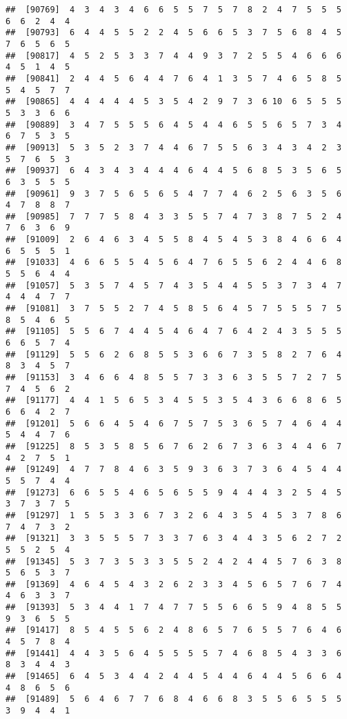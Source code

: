 \documentclass[
]{book}
\begin{document}
\begin{verbatim}
##  [90769]  4  3  4  3  4  6  6  5  5  7  5  7  8  2  4  7  5  5  5  6  6  2  4  4
##  [90793]  6  4  4  5  5  2  2  4  5  6  6  5  3  7  5  6  8  4  5  7  6  5  6  5
##  [90817]  4  5  2  5  3  3  7  4  4  9  3  7  2  5  5  4  6  6  6  4  5  1  4  5
##  [90841]  2  4  4  5  6  4  4  7  6  4  1  3  5  7  4  6  5  8  5  5  4  5  7  7
##  [90865]  4  4  4  4  4  5  3  5  4  2  9  7  3  6 10  6  5  5  5  5  3  3  6  6
##  [90889]  3  4  7  5  5  5  6  4  5  4  4  6  5  5  6  5  7  3  4  6  7  5  3  5
##  [90913]  5  3  5  2  3  7  4  4  6  7  5  5  6  3  4  3  4  2  3  5  7  6  5  3
##  [90937]  6  4  3  4  3  4  4  4  6  4  4  5  6  8  5  3  5  6  5  6  3  5  5  5
##  [90961]  9  3  7  5  6  5  6  5  4  7  7  4  6  2  5  6  3  5  6  4  7  8  8  7
##  [90985]  7  7  7  5  8  4  3  3  5  5  7  4  7  3  8  7  5  2  4  7  6  3  6  9
##  [91009]  2  6  4  6  3  4  5  5  8  4  5  4  5  3  8  4  6  6  4  6  5  5  5  1
##  [91033]  4  6  6  5  5  4  5  6  4  7  6  5  5  6  2  4  4  6  8  5  5  6  4  4
##  [91057]  5  3  5  7  4  5  7  4  3  5  4  4  5  5  3  7  3  4  7  4  4  4  7  7
##  [91081]  3  7  5  5  2  7  4  5  8  5  6  4  5  7  5  5  5  7  5  8  5  4  6  5
##  [91105]  5  5  6  7  4  4  5  4  6  4  7  6  4  2  4  3  5  5  5  6  6  5  7  4
##  [91129]  5  5  6  2  6  8  5  5  3  6  6  7  3  5  8  2  7  6  4  8  3  4  5  7
##  [91153]  3  4  6  6  4  8  5  5  7  3  3  6  3  5  5  7  2  7  5  7  4  5  6  2
##  [91177]  4  4  1  5  6  5  3  4  5  5  3  5  4  3  6  6  8  6  5  6  6  4  2  7
##  [91201]  5  6  6  4  5  4  6  7  5  7  5  3  6  5  7  4  6  4  4  5  4  4  7  6
##  [91225]  8  5  3  5  8  5  6  7  6  2  6  7  3  6  3  4  4  6  7  4  2  7  5  1
##  [91249]  4  7  7  8  4  6  3  5  9  3  6  3  7  3  6  4  5  4  4  5  5  7  4  4
##  [91273]  6  6  5  5  4  6  5  6  5  5  9  4  4  4  3  2  5  4  5  3  7  3  7  5
##  [91297]  1  5  5  3  3  6  7  3  2  6  4  3  5  4  5  3  7  8  6  7  4  7  3  2
##  [91321]  3  3  5  5  5  7  3  3  7  6  3  4  4  3  5  6  2  7  2  5  5  2  5  4
##  [91345]  5  3  7  3  5  3  3  5  5  2  4  2  4  4  5  7  6  3  8  5  6  5  3  7
##  [91369]  4  6  4  5  4  3  2  6  2  3  3  4  5  6  5  7  6  7  4  4  6  3  3  7
##  [91393]  5  3  4  4  1  7  4  7  7  5  5  6  6  5  9  4  8  5  5  9  3  6  5  5
##  [91417]  8  5  4  5  5  6  2  4  8  6  5  7  6  5  5  7  6  4  6  4  5  7  8  4
##  [91441]  4  4  3  5  6  4  5  5  5  5  7  4  6  8  5  4  3  3  6  8  3  4  4  3
##  [91465]  6  4  5  3  4  4  2  4  4  5  4  4  6  4  4  5  6  6  4  4  8  6  5  6
##  [91489]  5  6  4  6  7  7  6  8  4  6  6  8  3  5  5  6  5  5  5  3  9  4  4  1

\end{verbatim}
\end{document}
